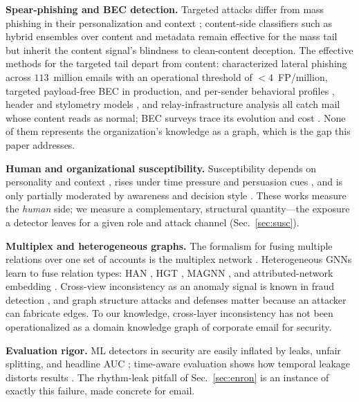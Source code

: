 \documentclass[conference]{IEEEtran}
\begin{document}
\textbf{Spear-phishing and BEC detection.} Targeted attacks differ from mass phishing in their
personalization and context \cite{birthriya2025detection}; content-side classifiers such as hybrid ensembles
over content and metadata \cite{bountakas2022helphed} remain effective for the mass tail but inherit the
content signal's blindness to clean-content deception. The effective methods for the targeted tail depart
from content: \cite{ho2019detecting} characterized lateral phishing across $113$~million emails with an
operational threshold of $<\!4$~FP/million, \cite{cidon2019high} targeted payload-free BEC in production, and
per-sender behavioral profiles \cite{gascon2018reading,stringhini2015thataint}, header and stylometry models
\cite{duman2016emailprofiler}, and relay-infrastructure analysis \cite{luo2024characterizing} all catch mail whose
content reads as normal; BEC surveys trace its evolution and cost \cite{atlam2023business}. None of them
represents the organization's knowledge as a graph, which is the gap this paper addresses.

\textbf{Human and organizational susceptibility.} Susceptibility depends on personality and context
\cite{halevi2015spearphishing}, rises under time pressure and persuasion cues \cite{butavicius2022why}, and is only
partially moderated by awareness and decision style \cite{sturman2025security}. These works measure the
\emph{human} side; we measure a complementary, structural quantity---the exposure a detector leaves for a
given role and attack channel (Sec.~\ref{sec:susc}).

\textbf{Multiplex and heterogeneous graphs.} The formalism for fusing multiple relations over one set of
accounts is the multiplex network \cite{kivela2014multilayer,dedomenico2013mathematical,magnani2013combinatorial,jeude2019multilayer}.
Heterogeneous GNNs learn to fuse relation types: HAN \cite{wang2019heterogeneous}, HGT \cite{hu2020heterogeneous},
MAGNN \cite{fu2020magnn}, and attributed-network embedding \cite{cen2019representation}.
Cross-view inconsistency as an anomaly signal is known in fraud detection \cite{liu2020alleviating}, and graph
structure attacks \cite{zugner2018adversarial,zugner2019adversarial,dai2022towards} and defenses
\cite{zhang2020gnnguard,jin2020graph} matter because an attacker can fabricate
edges. To our knowledge, cross-layer inconsistency has not been operationalized as a domain knowledge graph of
corporate email for security.

\textbf{Evaluation rigor.} ML detectors in security are easily inflated by leaks, unfair splitting, and
headline AUC \cite{arp2022dos}; time-aware evaluation shows how temporal leakage distorts results
\cite{pendlebury2019tesseract}. The rhythm-leak pitfall of Sec.~\ref{sec:enron} is an instance of exactly this
failure, made concrete for email.
\end{document}
